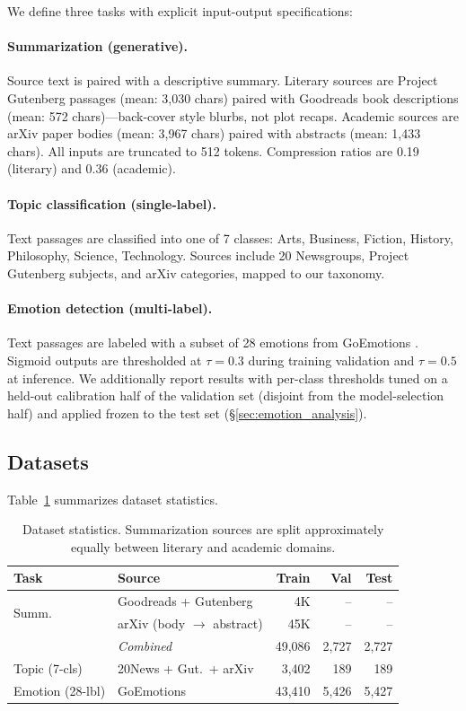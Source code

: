 \documentclass[11pt]{article}
\begin{document}
We define three tasks with explicit input-output specifications:

\paragraph{Summarization (generative).} Source text is paired with a descriptive summary. Literary sources are Project Gutenberg passages (mean: 3,030 chars) paired with Goodreads book descriptions (mean: 572 chars)---back-cover style blurbs, not plot recaps. Academic sources are arXiv paper bodies (mean: 3,967 chars) paired with abstracts (mean: 1,433 chars). All inputs are truncated to 512 tokens. Compression ratios are 0.19 (literary) and 0.36 (academic).

\paragraph{Topic classification (single-label).} Text passages are classified into one of 7 classes: Arts, Business, Fiction, History, Philosophy, Science, Technology. Sources include 20 Newsgroups, Project Gutenberg subjects, and arXiv categories, mapped to our taxonomy.

\paragraph{Emotion detection (multi-label).} Text passages are labeled with a subset of 28 emotions from GoEmotions \citep{demszky2020goemotions}. Sigmoid outputs are thresholded at $\tau=0.3$ during training validation and $\tau=0.5$ at inference. We additionally report results with per-class thresholds tuned on a held-out calibration half of the validation set (disjoint from the model-selection half) and applied frozen to the test set (\S\ref{sec:emotion_analysis}).

\subsection{Datasets}

Table~\ref{tab:datasets} summarizes dataset statistics.

\begin{table}[t]
\centering
\caption{Dataset statistics. Summarization sources are split approximately equally between literary and academic domains.}
\label{tab:datasets}
\setlength{\tabcolsep}{2pt}
\scriptsize
\begin{tabular}{@{}llrrr@{}}
\toprule
\textbf{Task} & \textbf{Source} & \textbf{Train} & \textbf{Val} & \textbf{Test} \\
\midrule
\multirow{2}{*}{Summ.} & Goodreads + Gutenberg & 4K & -- & -- \\
 & arXiv (body $\to$ abstract) & 45K & -- & -- \\
 & \textit{Combined} & 49,086 & 2,727 & 2,727 \\
\midrule
Topic (7-cls) & 20News + Gut.\ + arXiv & 3,402 & 189 & 189 \\
\midrule
Emotion (28-lbl) & GoEmotions & 43,410 & 5,426 & 5,427 \\
\bottomrule
\end{tabular}
\end{table}
\end{document}
